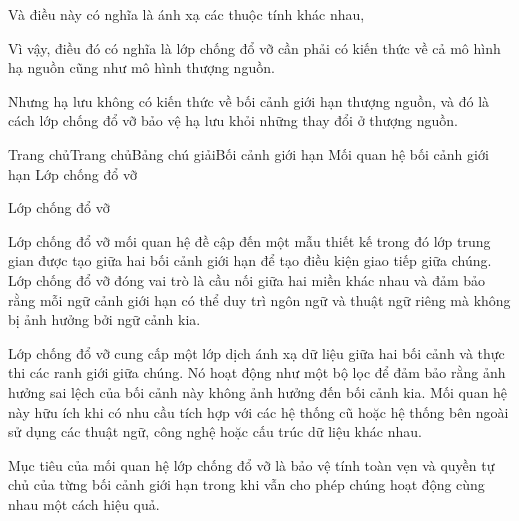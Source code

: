 
Và điều này có nghĩa là ánh xạ các thuộc tính khác nhau,

Vì vậy, điều đó có nghĩa là lớp chống đổ vỡ cần phải có kiến thức về cả mô hình hạ nguồn cũng như mô hình thượng nguồn.

Nhưng hạ lưu không có kiến thức về bối cảnh giới hạn thượng nguồn, và đó là cách lớp chống đổ vỡ bảo vệ hạ lưu khỏi những thay đổi ở thượng nguồn.







Trang chủTrang chủBảng chú giảiBối cảnh giới hạn Mối quan hệ bối cảnh giới hạn Lớp chống đổ vỡ

Lớp chống đổ vỡ

Lớp chống đổ vỡ mối quan hệ đề cập đến một mẫu thiết kế trong đó lớp trung gian được tạo giữa hai bối cảnh giới hạn để tạo điều kiện giao tiếp giữa chúng. Lớp chống đổ vỡ đóng vai trò là cầu nối giữa hai miền khác nhau và đảm bảo rằng mỗi ngữ cảnh giới hạn có thể duy trì ngôn ngữ và thuật ngữ riêng mà không bị ảnh hưởng bởi ngữ cảnh kia.

Lớp chống đổ vỡ cung cấp một lớp dịch ánh xạ dữ liệu giữa hai bối cảnh và thực thi các ranh giới giữa chúng. Nó hoạt động như một bộ lọc để đảm bảo rằng ảnh hưởng sai lệch của bối cảnh này không ảnh hưởng đến bối cảnh kia. Mối quan hệ này hữu ích khi có nhu cầu tích hợp với các hệ thống cũ hoặc hệ thống bên ngoài sử dụng các thuật ngữ, công nghệ hoặc cấu trúc dữ liệu khác nhau.

Mục tiêu của mối quan hệ lớp chống đổ vỡ là bảo vệ tính toàn vẹn và quyền tự chủ của từng bối cảnh giới hạn trong khi vẫn cho phép chúng hoạt động cùng nhau một cách hiệu quả.

